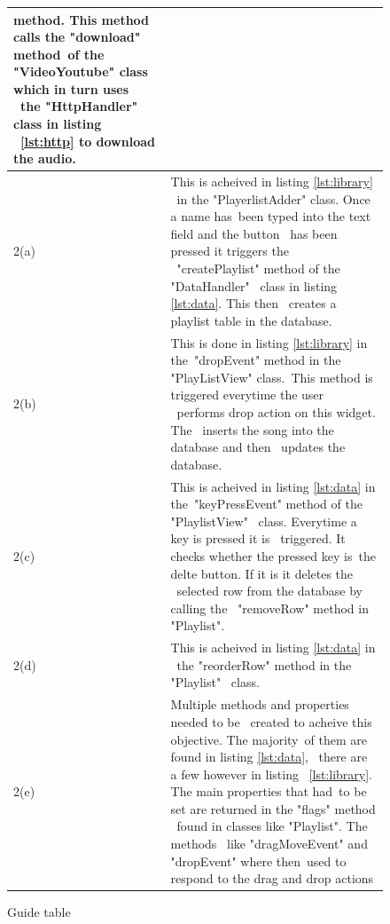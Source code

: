 \documentclass{article}
\begin{document}
\begin{figure}[H]
\begin{tabular} {| p{2cm} | p{10cm} |}
                             method. This method calls the "download" method\
                             of the "VideoYoutube" class which in turn uses \
                             the "HttpHandler" class in listing             \
                             \ref{lst:http} to download the audio.          \\ \hline
        2(a)                &This is acheived in listing \ref{lst:library}  \
                             in the "PlayerlistAdder" class. Once a name has\
                             been typed into the text field and the button  \
                             has been pressed it triggers the               \
                             "createPlaylist" method of the "DataHandler"   \
                             class in listing \ref{lst:data}. This then     \
                             creates a playlist table in the database.      \\ \hline
        2(b)                &This is done in listing \ref{lst:library} in the\
                             "dropEvent" method in the "PlayListView" class.\
                             This method is triggered everytime the user    \
                             performs drop action on this widget. The       \
                             inserts the song into the database and then    \
                             updates the database.                          \\ \hline
        2(c)                &This is acheived in listing \ref{lst:data} in the\
                             "keyPressEvent" method of the "PlaylistView"   \
                             class. Everytime a key is pressed it is        \
                             triggered. It checks whether the pressed key is\
                             the delte button. If it is it deletes the      \
                             selected row from the database by calling the  \
                             "removeRow" method in "Playlist".              \\ \hline
        2(d)                &This is acheived in listing \ref{lst:data} in  \
                             the "reorderRow" method in the "Playlist"      \
                             class.                                         \\ \hline
        2(e)                &Multiple methods and properties needed to be   \
                             created to acheive this objective. The majority\
                             of them are found in listing \ref{lst:data},   \
                             there are a few however in listing             \
                             \ref{lst:library}. The main properties that had\
                             to be set are returned in the "flags" method   \
                             found in classes like "Playlist". The methods  \
                             like "dragMoveEvent" and "dropEvent" where then\
                             used to respond to the drag and drop actions   \\ \hline
    \end{tabular}
    \caption{Guide table} \label{fig:guideTable}
\end{figure}
\end{document}
